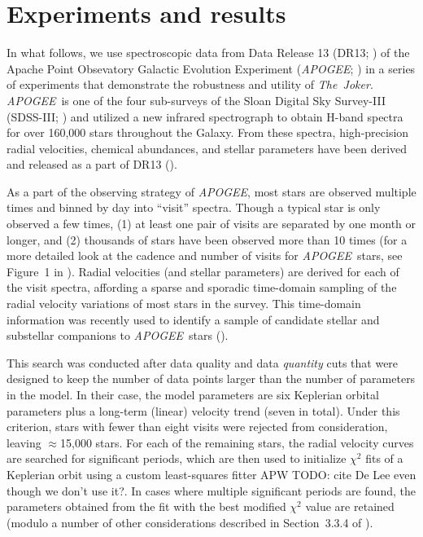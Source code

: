 \documentclass[12pt, preprint]{aastex6}
\newcommand{\project}[1]{\textsl{#1}}
\newcommand{\acronym}[1]{{\small{#1}}}
\newcommand{\apogee}{\project{\acronym{APOGEE}}}
\newcommand{\samplername}{\project{The~Joker}}
\newcommand{\todoapw}[1]{{\color{red}APW TODO: #1}}
\begin{document}
\section{Experiments and results}

In what follows, we use spectroscopic data from Data Release 13 (DR13;
\citealt{SDSS-Collaboration:2016}) of the Apache Point Obsevatory Galactic
Evolution Experiment (\apogee; \citealt{Majewski:2015}) in a series of
experiments that demonstrate the robustness and utility of \samplername.
\apogee\ is one of the four sub-surveys of the Sloan Digital Sky Survey-III
(SDSS-III; \citealt{Eisenstein:2011}) and utilized a new infrared spectrograph
to obtain H-band spectra for over 160,000 stars throughout the Galaxy.
From these spectra, high-precision radial velocities, chemical abundances, and
stellar parameters have been derived and released as a part of DR13
(\citealt{Holtzman:2015,Nidever:2015}).

As a part of the observing strategy of \apogee, most stars are observed multiple
times and binned by day into ``visit'' spectra.
Though a typical star is only observed a few times, (1) at least one pair of
visits are separated by one month or longer, and (2) thousands of stars have
been observed more than 10 times (for a more detailed look at the cadence and
number of visits for \apogee\ stars, see Figure~1 in \citealt{Troup:2016}).
Radial velocities (and stellar parameters) are derived for each of the visit
spectra, affording a sparse and sporadic time-domain sampling of the radial
velocity variations of most stars in the survey.
This time-domain information was recently used to identify a sample of candidate
stellar and substellar companions to \apogee\ stars (\citealt{Troup:2016}).

This search was conducted after data quality and data \emph{quantity} cuts that
were designed to keep the number of data points larger than the number of
parameters in the model.
In their case, the model parameters are six Keplerian orbital parameters plus a
long-term (linear) velocity trend (seven in total).
Under this criterion, stars with fewer than eight visits were rejected from
consideration, leaving $\approx$15,000 stars.
For each of the remaining stars, the radial velocity curves are searched for
significant periods, which are then used to initialize $\chi^2$ fits of a
Keplerian orbit using a custom least-squares fitter \todoapw{cite De Lee even
though we don't use it?}.
In cases where multiple significant periods are found, the parameters obtained
from the fit with the best modified $\chi^2$ value are retained (modulo a number
of other considerations described in Section~3.3.4 of \citealt{Troup:2016}).
\end{document}

